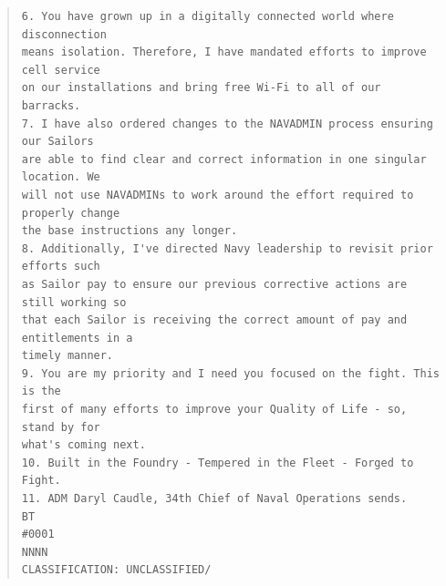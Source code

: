 \documentclass[../main.tex]{subfiles}
\begin{document}
\begin{quote}
\begin{verbatim}
6. You have grown up in a digitally connected world where disconnection
means isolation. Therefore, I have mandated efforts to improve cell service
on our installations and bring free Wi-Fi to all of our barracks.
7. I have also ordered changes to the NAVADMIN process ensuring our Sailors
are able to find clear and correct information in one singular location. We
will not use NAVADMINs to work around the effort required to properly change
the base instructions any longer.
8. Additionally, I've directed Navy leadership to revisit prior efforts such
as Sailor pay to ensure our previous corrective actions are still working so
that each Sailor is receiving the correct amount of pay and entitlements in a
timely manner.
9. You are my priority and I need you focused on the fight. This is the
first of many efforts to improve your Quality of Life - so, stand by for
what's coming next.
10. Built in the Foundry - Tempered in the Fleet - Forged to Fight.
11. ADM Daryl Caudle, 34th Chief of Naval Operations sends.
BT
#0001
NNNN
CLASSIFICATION: UNCLASSIFIED/
\end{verbatim}
\end{quote}
\end{document}
